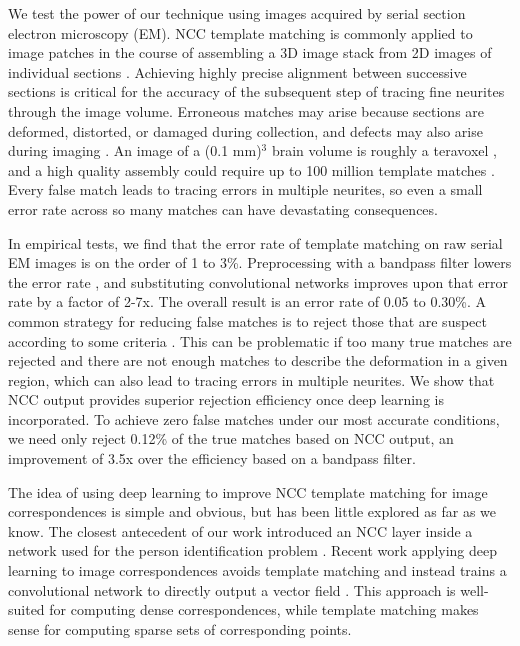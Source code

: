 \documentclass{article}
\begin{document}
We test the power of our technique using images acquired by serial section electron microscopy (EM). NCC template matching is commonly applied to image patches in the course of assembling a 3D image stack from 2D images of individual sections \cite{preibisch2009bead, saalfeld2012elastic}. Achieving highly precise alignment between successive sections is critical for the accuracy of the subsequent step of tracing fine neurites through the image volume. Erroneous matches may arise because sections are deformed, distorted, or damaged during collection, and defects may also arise during imaging \cite{saalfeld2012elastic}. An image of a (0.1 mm)$^3$ brain volume is roughly a teravoxel \cite{lichtman2014bigdata}, and a high quality assembly could require up to 100 million template matches \cite{saalfeld2012elastic}. Every false match leads to tracing errors in multiple neurites, so even a small error rate across so many matches can have devastating consequences.


In empirical tests, we find that the error rate of template matching on raw serial EM images is on the order of 1 to 3\%. Preprocessing with a bandpass filter lowers the error rate \cite{berg2001geometric}, and substituting convolutional networks improves upon that error rate by a factor of 2-7x. The overall result is an error rate of 0.05 to 0.30\%. A common strategy for reducing false matches is to reject those that are suspect according to some criteria \cite{saalfeld2012elastic}. This can be problematic if too many true matches are rejected and there are not enough matches to describe the deformation in a given region, which can also lead to tracing errors in multiple neurites. We show that NCC output provides superior rejection efficiency once deep learning is incorporated. To achieve zero false matches under our most accurate conditions, we need only reject 0.12\% of the true matches based on NCC output, an improvement of 3.5x over the efficiency based on a bandpass filter.

The idea of using deep learning to improve NCC template matching for image correspondences is simple and obvious, but has been little explored as far as we know. The closest antecedent of our work introduced an NCC layer inside a network used for the person identification problem \cite{subramaniam2016deep}. Recent work applying deep learning to image correspondences avoids template matching and instead trains a convolutional network to directly output a vector field \cite{dosovitskiy2015flownet, long2014convnets, pathak2016learning}. This approach is well-suited for computing dense correspondences, while template matching makes sense for computing sparse sets of corresponding points.
\end{document}
